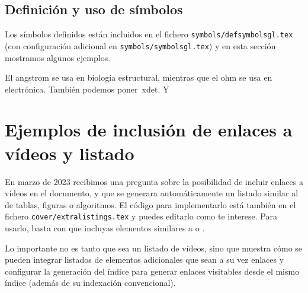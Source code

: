 \subsection{Definición y uso de símbolos}
\label{sec:simbolos}

Los símbolos definidos están incluidos en el fichero \texttt{symbols/defsymbolsgl.tex} (con configuración adicional en \texttt{symbols/symbolsgl.tex}) y en esta sección mostramos algunos ejemplos.

El \ac{angstrom} se usa en biología estructural, mientras que el \ac{ohm} se usa en electrónica. También podemos poner~\ac{xdet}. Y


\section{Ejemplos de inclusión de enlaces a vídeos y listado}
\label{sec:videolink}

En marzo de 2023 recibimos una pregunta sobre la posibilidad de incluir enlaces a vídeos en el documento, y que se generara automáticamente un listado similar al de tablas, figuras o algoritmos. El código para implementarlo está también en el fichero \texttt{cover/extralistings.tex} y puedes editarlo como te interese. Para usarlo, basta con que incluyas elementos similares a  o .

Lo importante no es tanto que sea un listado de vídeos, sino que muestra cómo se pueden integrar listados de elementos adicionales que sean a su vez enlaces y configurar la generación del índice para generar enlaces visitables desde el mismo índice (además de su indexación convencional).




